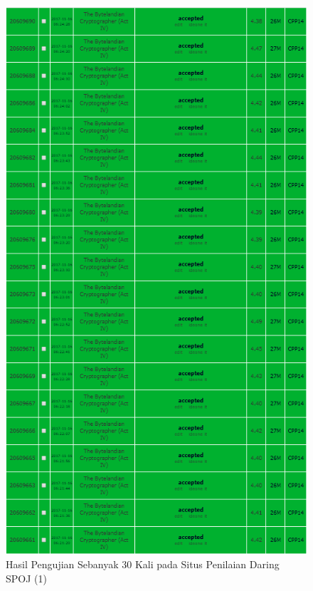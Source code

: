  	\begin{figure}[H]
  	\centering
  	 \includegraphics[scale=0.6]{images/lampiran/uji1.png}
  	\caption{Hasil Pengujian Sebanyak 30 Kali pada Situs Penilaian Daring SPOJ (1)}
  	\label{fig:submission1}
  \end{figure}
  
